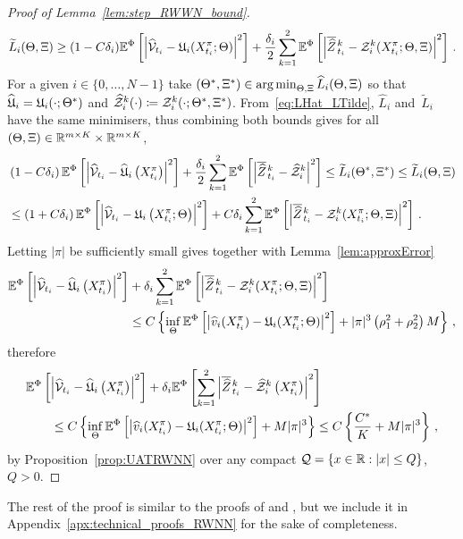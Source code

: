 \begin{proof}[Proof of Lemma~\ref{lem:step_RWWN_bound}]
    \[
        \widetilde{L}_i(\Theta, \Xi) \geq (1-C\delta_{i} )\mathbb{E}^\Phi\left[\left\lvert \widehat {\mathcal{V}}_{t_i} - \mathfrak{U}_i(X^\pi_{t_i}; \Theta)\right\rvert^2\right] + \frac{\delta_{i}}2\sum_{k=1}^2\mathbb{E}^\Phi\left[ \left\lvert \overline{\widehat{Z}}\kern0.1em^{k}_{t_{i}} - \mathcal{Z}_i^k(X^\pi_{t_i}; \Theta, \Xi)\right\rvert^2\right]\,.
    \]
For a given $i\in\{0,\dots,N-1\}$ take $(\Theta^*, \Xi^*)\in\operatorname*{arg\,min}_{\Theta, \Xi} \widehat{L}_i(\Theta, \Xi)$ so that $\widehat{\mathfrak{U}}_i=\mathfrak{U}_i(\cdot; \Theta^*)$ and $\widehat{\mathcal{Z}}_i^k(\cdot) \coloneqq  \mathcal{Z}^k_i(\cdot; \Theta^*, \Xi^*)$. 
    From~\eqref{eq:LHat_LTilde}, $\widehat{L}_i$ and~$\widetilde{L}_i$ have the same minimisers, thus combining both bounds gives for all $(\Theta,\Xi)\in\mathbb{R}^{m\times K}\times\mathbb{R}^{m\times K}$,
    \begin{align*}
            &\left(1-C \delta_{i} \right) \mathbb{E}^\Phi\left[\left|\widehat {\mathcal{V}}_{t_{i}}-\widehat{\mathfrak{U}}_{i}\left(X^\pi_{t_{i}}\right)\right|^{2}\right]+\frac{\delta_{i}}2\sum_{k=1}^2\mathbb{E}^\Phi\left[ \left\lvert \overline{\widehat{Z}}\kern0.1em^{k}_{t_{i}} - \widehat{\mathcal{Z}}_i^k\right\rvert^2\right] \leq \widetilde{L}_i(\Theta^*,\Xi^*)\leq \widetilde{L}_{i}(\Theta, \Xi) \\
            &\leq\left(1+C \delta_{i} \right) \mathbb{E}^\Phi\left[\left|\widehat {\mathcal{V}}_{t_{i}}-\mathfrak{U}_{i}\left(X^\pi_{t_{i}} ; \Theta\right)\right|^{2}\right]+C \delta_{i} \sum_{k=1}^2\mathbb{E}^\Phi\left[ \left\lvert \overline{\widehat{Z}}\kern0.1em^{k}_{t_{i}} - \mathcal{Z}_i^k(X^\pi_{t_i}; \Theta, \Xi)\right\rvert^2\right]\,.
    \end{align*}
    Letting $|\pi|$ be sufficiently small gives together with Lemma~\ref{lem:approxError}
    \begin{align*}
        \mathbb{E}^\Phi\left[\left|\widehat {\mathcal{V}}_{t_{i}}-\widehat{\mathfrak{U}}_{i}\left(X^\pi_{t_{i}}\right)\right|^{2}\right] &+ \delta_{i}  \sum_{k=1}^2\mathbb{E}^\Phi\left[ \left\lvert \overline{\widehat{Z}}\kern0.1em^{k}_{t_{i}} - \mathcal{Z}_i^k(X^\pi_{t_i}; \Theta, \Xi)\right\rvert^2\right] \\ 
        &\leq C \left\{\inf_\Theta\mathbb{E}^\Phi\left[\left|\widehat v_i(X^\pi_{t_i})-\mathfrak{U}_i(X^\pi_{t_i}; \Theta)\right|^2\right]
         + |\pi|^3\left(\rho_1^2  + \rho_2^2\right)M\right\}\,,
    \end{align*}
    therefore
    \begin{align*}
    &\mathbb{E}^\Phi\left[\left|\widehat{\mathcal{V}}_{t_{i}}-\widehat{\mathfrak{U}}_{i}\left(X^\pi_{t_{i}}\right)\right|^{2}\right] + \delta_{i}  \mathbb{E}^\Phi\left[\sum_{k=1}^2\left|\overline{\widehat{Z}}\kern0.1em^{k}_{t_{i}}-\widehat{\mathcal{Z}}^k_{i}\left(X^\pi_{t_{i}}\right)\right|^{2}\right] \\
    & \qquad \leq C\left\{ \inf_\Theta\mathbb{E}^\Phi\left[\left|\widehat v_i(X^\pi_{t_i})-\mathfrak{U}_i(X^\pi_{t_i}; \Theta)\right|^2\right]
    + M|\pi|^3 \right\}
    \leq C\left\{ \frac{C^{*}}{K}  + M|\pi|^3 \right\}\,,
    \end{align*}
    by Proposition~\ref{prop:UATRWNN} over any compact $\mathcal{Q} = \{x\in\mathbb{R}: |x|\leq Q\}$, $Q>0$.
\end{proof}
The rest of the proof is similar to the proofs of \cite[Theorem A.2]{Bayer2022PricingSPDEs} and \cite[Theorem~4.1]{Hure2020DeepPDEs}, but we include it in Appendix~\ref{apx:technical_proofs_RWNN} for the sake of completeness. 

